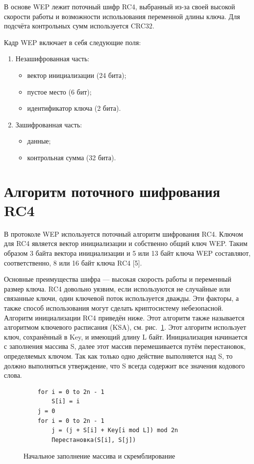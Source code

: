 В основе WEP лежит поточный шифр RC4, выбранный из-за своей высокой скорости
работы и возможности использования переменной длины ключа. Для подсчёта
контрольных сумм используется CRC32.

Кадр WEP включает в себя следующие поля:
\begin{enumerate}
    \item Незашифрованная часть:
    \begin{itemize}
        \item вектор инициализации (24 бита);
        \item пустое место (6 бит);
        \item идентификатор ключа (2 бита).
    \end{itemize}
    \item Зашифрованная часть:
    \begin{itemize}
        \item данные;
        \item контрольная сумма (32 бита).
    \end{itemize}
\end{enumerate}

\section{Алгоритм поточного шифрования RC4}

В протоколе WEP используется поточный алгоритм шифрования RC4. Ключом для RC4
является вектор инициализации и собственно общий ключ WEP. Таким образом 3 байта
вектора инициализации и 5 или 13 байт ключа WEP составляют, соответственно, 8
или 16 байт ключа RC4 [5].

Основные преимущества шифра --- высокая скорость работы и переменный размер
ключа. RC4 довольно уязвим, если используются не случайные или связанные ключи,
один ключевой поток используется дважды. Эти факторы, а также способ
использования могут сделать криптосистему небезопасной. Алгоритм инициализации
RC4 приведён ниже. Этот алгоритм также называется алгоритмом ключевого
расписания (KSA), см. рис.~\ref{fig:array_initialization_scrembling}.
Этот алгоритм использует ключ, сохранённый в Key, и имеющий длину L байт.
Инициализация начинается с заполнения массива S, далее этот массив
перемешивается путём перестановок, определяемых ключом. Так как только одно
действие выполняется над S, то должно выполняться утверждение, что S всегда
содержит все значения кодового слова.

\begin{figure}
    \begin{lstlisting}
    for i = 0 to 2n - 1
        S[i] = i
    j = 0
    for i = 0 to 2n - 1
        j = (j + S[i] + Key[i mod L]) mod 2n
        Перестановка(S[i], S[j])
    \end{lstlisting}
    \caption{Начальное заполнение массива и скремблирование}
    \label{fig:array_initialization_scrembling}
\end{figure}

